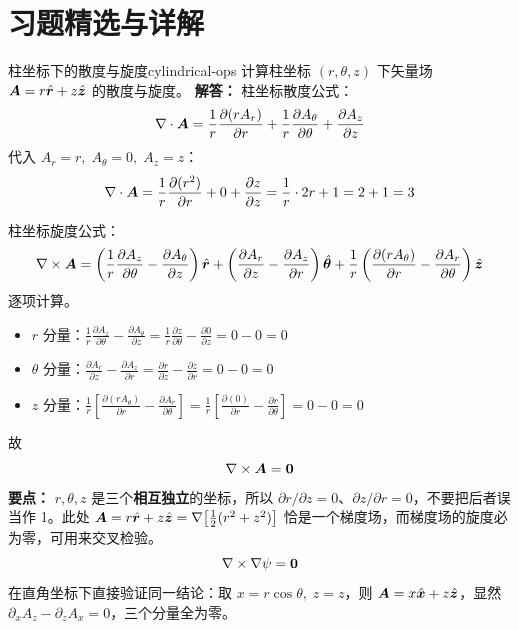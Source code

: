 
\section*{习题精选与详解}
{}

\begin{example}{柱坐标下的散度与旋度}{cylindrical-ops}
计算柱坐标 $(r,\theta,z)$ 下矢量场 $\bm{A} = r\hat{\bm{r}} + z\hat{\bm{z}}$ 的散度与旋度。
\tcblower
\textbf{解答：}
柱坐标散度公式：
\[
\nabla\cdot\bm{A} = \frac{1}{r}\frac{\partial(rA_r)}{\partial r} + \frac{1}{r}\frac{\partial A_\theta}{\partial\theta} + \frac{\partial A_z}{\partial z}
\]
代入 $A_r = r,\; A_\theta = 0,\; A_z = z$：
\[
\nabla\cdot\bm{A} = \frac{1}{r}\frac{\partial(r^2)}{\partial r} + 0 + \frac{\partial z}{\partial z} = \frac{1}{r}\cdot 2r + 1 = 2 + 1 = 3
\]

柱坐标旋度公式：
\[
\nabla\times\bm{A} = \left(\frac{1}{r}\frac{\partial A_z}{\partial\theta} - \frac{\partial A_\theta}{\partial z}\right)\hat{\bm{r}} + \left(\frac{\partial A_r}{\partial z} - \frac{\partial A_z}{\partial r}\right)\hat{\bm{\theta}} + \frac{1}{r}\left(\frac{\partial(rA_\theta)}{\partial r} - \frac{\partial A_r}{\partial\theta}\right)\hat{\bm{z}}
\]
逐项计算。
\begin{itemize}[leftmargin=*,itemsep=0pt]
\item $r$ 分量：$\frac{1}{r}\frac{\partial A_z}{\partial\theta} - \frac{\partial A_\theta}{\partial z} = \frac{1}{r}\frac{\partial z}{\partial\theta} - \frac{\partial 0}{\partial z} = 0 - 0 = 0$
\item $\theta$ 分量：$\frac{\partial A_r}{\partial z} - \frac{\partial A_z}{\partial r} = \frac{\partial r}{\partial z} - \frac{\partial z}{\partial r} = 0 - 0 = 0$
\item $z$ 分量：$\frac{1}{r}\left[\frac{\partial(rA_\theta)}{\partial r} - \frac{\partial A_r}{\partial\theta}\right] = \frac{1}{r}\left[\frac{\partial(0)}{\partial r} - \frac{\partial r}{\partial\theta}\right] = 0 - 0 = 0$
\end{itemize}
故
\[
\nabla\times\bm{A} = \bm{0}
\]
\textbf{要点：} $r,\theta,z$ 是三个\textbf{相互独立}的坐标，所以 $\partial r/\partial z = 0$、$\partial z/\partial r = 0$，不要把后者误当作 1。此处 $\bm{A}=r\hat{\bm{r}}+z\hat{\bm{z}}=\nabla\!\left[\frac{1}{2}(r^2+z^2)\right]$ 恰是一个梯度场，而梯度场的旋度必为零，可用来交叉检验。
\[
\nabla\times\nabla\psi = \bm{0}
\]
在直角坐标下直接验证同一结论：取 $x=r\cos\theta,\;z=z$，则 $\bm{A}=x\hat{\bm{x}}+z\hat{\bm{z}}$，显然 $\partial_x A_z-\partial_z A_x=0$，三个分量全为零。
\end{example}

